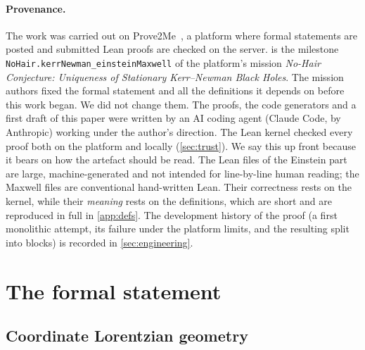 \documentclass[11pt]{article}
\theoremstyle{definition}
\theoremstyle{remark}
\newcommand{\lean}[1]{\lstinline[basicstyle=\ttfamily\normalsize,columns=fullflexible,breaklines=false]{#1}}
\begin{document}
\paragraph{Provenance.}
The work was carried out on Prove2Me~\cite{prove2me}, a platform where formal statements are posted and submitted Lean proofs are checked on the server.
 is the milestone \lean{NoHair.kerrNewman_einsteinMaxwell} of the platform's mission \emph{No-Hair Conjecture: Uniqueness of Stationary Kerr--Newman Black Holes}.
The mission authors fixed the formal statement and all the definitions it depends on before this work began.
We did not change them.
The proofs, the code generators and a first draft of this paper were written by an AI coding agent (Claude Code, by Anthropic) working under the author's direction.
The Lean kernel checked every proof both on the platform and locally (\cref{sec:trust}).
We say this up front because it bears on how the artefact should be read.
The Lean files of the Einstein part are large, machine-generated and not intended for line-by-line human reading; the Maxwell files are conventional hand-written Lean.
Their correctness rests on the kernel, while their \emph{meaning} rests on the definitions, which are short and are reproduced in full in \cref{app:defs}.
The development history of the proof (a first monolithic attempt, its failure under the platform limits, and the resulting split into blocks) is recorded in \cref{sec:engineering}.

\section{The formal statement}\label{sec:statement}

\subsection{Coordinate Lorentzian geometry}\label{sec:defs}
\end{document}
